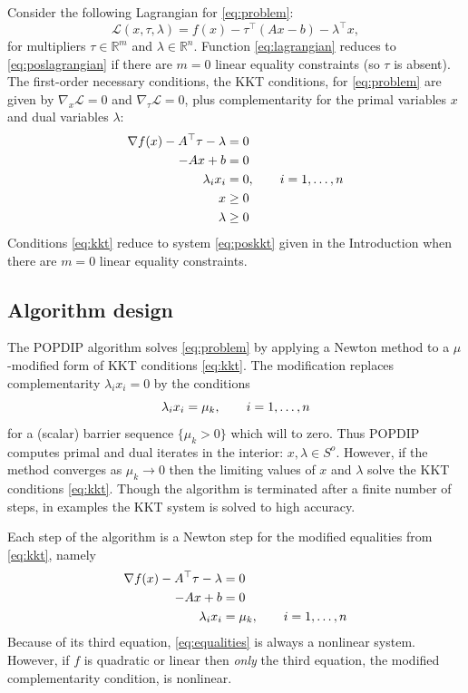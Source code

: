 \documentclass[11pt]{article}
\newcommand{\RR}{\mathbb{R}}
\newcommand{\grad}{\nabla}
\begin{document}
Consider the following Lagrangian for \eqref{eq:problem}:
\begin{equation}
\mathcal{L}(x,\tau,\lambda) = f(x) - \tau^\top (Ax - b) - \lambda^\top x, \label{eq:lagrangian}
\end{equation}
for multipliers $\tau\in\RR^m$ and $\lambda\in \RR^n$.  Function \eqref{eq:lagrangian} reduces to \eqref{eq:poslagrangian} if there are $m=0$ linear equality constraints (so $\tau$ is absent).  The first-order necessary conditions, the KKT conditions, for \eqref{eq:problem} are given by $\grad_x\mathcal{L}=0$ and $\grad_\tau\mathcal{L}=0$, plus complementarity for the primal variables $x$ and dual variables $\lambda$:
\begin{align}
\grad f(x) - A^\top \tau - \lambda &= 0 \label{eq:kkt} \\
-A x + b &= 0 \notag \\
\lambda_i x_i &=0, \qquad i=1,\dots,n \notag \\
x &\ge 0 \notag \\
\lambda &\ge 0 \notag
\end{align}
Conditions \eqref{eq:kkt} reduce to system \eqref{eq:poskkt} given in the Introduction when there are $m=0$ linear equality constraints.


\subsection*{Algorithm design}

The POPDIP algorithm solves \eqref{eq:problem} by applying a Newton method to a $\mu$-modified form of KKT conditions \eqref{eq:kkt}.  The modification replaces complementarity $\lambda_i x_i = 0$ by the conditions
\begin{equation}
\lambda_i x_i = \mu_k, \qquad i=1,\dots,n \notag \\
\end{equation}
for a (scalar) barrier sequence $\{\mu_k>0\}$ which will to zero.  Thus POPDIP computes primal and dual iterates in the interior: $x,\lambda \in S^o$.  However, if the method converges as $\mu_k \to 0$ then the limiting values of $x$ and $\lambda$ solve the KKT conditions \eqref{eq:kkt}.  Though the algorithm is terminated after a finite number of steps, in examples the KKT system is solved to high accuracy.

Each step of the algorithm is a Newton step for the modified equalities from \eqref{eq:kkt}, namely
\begin{align}
\grad f(x) - A^\top \tau - \lambda &= 0 \label{eq:equalities} \\
-A x + b &= 0 \notag \\
\lambda_i x_i &= \mu_k, \qquad i=1,\dots,n \notag
\end{align}
Because of its third equation, \eqref{eq:equalities} is always a nonlinear system.  However, if $f$ is quadratic or linear then \emph{only} the third equation, the modified complementarity condition, is nonlinear.
\end{document}
